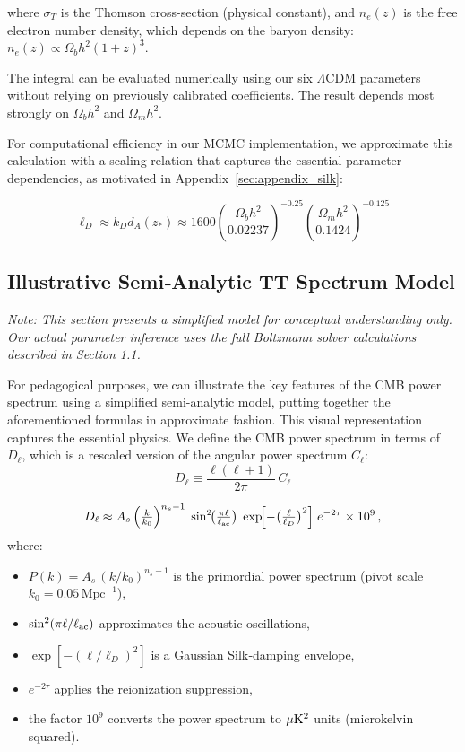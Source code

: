 \documentclass[11pt]{article}
\theoremstyle{definition}
\begin{document}
where $\sigma_T$ is the Thomson cross-section (physical constant), and $n_e(z)$ is the free electron number density, which depends on the baryon density: $n_e(z) \propto \Omega_b h^2 (1+z)^3$.

The integral can be evaluated numerically using our six $\Lambda$CDM parameters without relying on previously calibrated coefficients. The result depends most strongly on $\Omega_b h^2$ and $\Omega_m h^2$.

For computational efficiency in our MCMC implementation, we approximate this calculation with a scaling relation that captures the essential parameter dependencies, as motivated in Appendix~\ref{sec:appendix_silk}:

\begin{equation}
\ell_D \approx k_D d_A(z_*) \approx 1600 \left(\frac{\Omega_b h^2}{0.02237}\right)^{-0.25} \left(\frac{\Omega_m h^2}{0.1424}\right)^{-0.125}
\end{equation}


\subsection{Illustrative Semi‑Analytic TT Spectrum Model}
\textit{Note: This section presents a simplified model for conceptual understanding only. Our actual parameter inference uses the full Boltzmann solver calculations described in Section 1.1.}

For pedagogical purposes, we can illustrate the key features of the CMB power spectrum using a simplified semi-analytic model, putting together the aforementioned formulas in approximate fashion. This visual representation captures the essential physics. We define the CMB power spectrum in terms of $D_{\ell}$, which is a rescaled version of the angular power spectrum $C_{\ell}$:
\[
D_\ell \equiv \frac{\ell(\ell+1)}{2\pi}\,C_\ell
\]


\[
D_\ell \approx A_s \,\Bigl(\tfrac{k}{k_0}\Bigr)^{n_s-1}
\;\sin^2\!\bigl(\tfrac{\pi\ell}{\ell_{\rm ac}}\bigr)
\;\exp\!\Bigl[-\bigl(\tfrac{\ell}{\ell_D}\bigr)^2\Bigr]
\;e^{-2\tau}\times10^{9}\,,
\]
where:
\begin{itemize}
  \item $P(k)=A_s\,(k/k_0)^{n_s-1}$ is the primordial power spectrum (pivot scale $k_0=0.05\,\mathrm{Mpc}^{-1}$),
  \item $\sin^2(\pi\ell/\ell_{\rm ac})$ approximates the acoustic oscillations,
  \item $\exp[-(\ell/\ell_D)^2]$ is a Gaussian Silk‑damping envelope,
  \item $e^{-2\tau}$ applies the reionization suppression,
  \item the factor $10^9$ converts the power spectrum to $\mu{\rm K}^2$ units (microkelvin squared).
\end{itemize}
\end{document}
